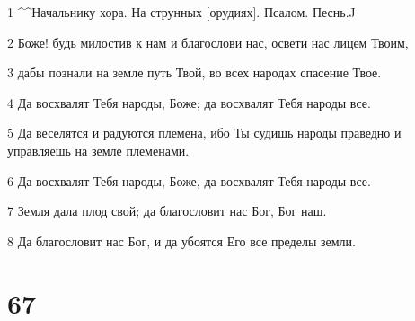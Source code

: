 \par 1 ^^Начальнику хора. На струнных [орудиях]. Псалом. Песнь.^^
\par 2 Боже! будь милостив к нам и благослови нас, освети нас лицем Твоим,
\par 3 дабы познали на земле путь Твой, во всех народах спасение Твое.
\par 4 Да восхвалят Тебя народы, Боже; да восхвалят Тебя народы все.
\par 5 Да веселятся и радуются племена, ибо Ты судишь народы праведно и управляешь на земле племенами.
\par 6 Да восхвалят Тебя народы, Боже, да восхвалят Тебя народы все.
\par 7 Земля дала плод свой; да благословит нас Бог, Бог наш.
\par 8 Да благословит нас Бог, и да убоятся Его все пределы земли.

\chapter{67}

